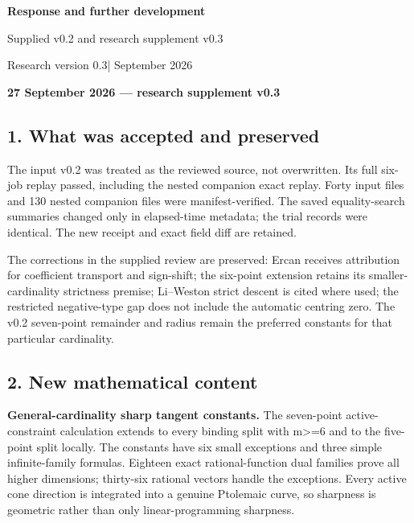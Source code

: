 \documentclass[11pt,a4paper]{article}
\begin{document}
\begin{center}
{\LARGE\bfseries Response and further development\par}
\vspace{6pt}
{\large Supplied v0.2 and research supplement v0.3\par}
\vspace{8pt}
{\small Research version 0.3\quad | September 2026\par}
\end{center}
\vspace{4pt}
\textbf{27 September 2026 --- research supplement v0.3}

\subsection{1. What was accepted and
preserved}\label{what-was-accepted-and-preserved}

The input v0.2 was treated as the reviewed source, not overwritten. Its
full six-job replay passed, including the nested companion exact replay.
Forty input files and 130 nested companion files were manifest-verified.
The saved equality-search summaries changed only in elapsed-time
metadata; the trial records were identical. The new receipt and exact
field diff are retained.

The corrections in the supplied review are preserved: Ercan receives
attribution for coefficient transport and sign-shift; the six-point
extension retains its smaller-cardinality strictness premise; Li--Weston
strict descent is cited where used; the restricted negative-type gap
does not include the automatic centring zero. The v0.2 seven-point
remainder and radius remain the preferred constants for that particular
cardinality.

\subsection{2. New mathematical content}\label{new-mathematical-content}

\textbf{General-cardinality sharp tangent constants.} The seven-point
active-constraint calculation extends to every binding split with
m\textgreater=6 and to the five-point split locally. The constants have
six small exceptions and three simple infinite-family formulas. Eighteen
exact rational-function dual families prove all higher dimensions;
thirty-six rational vectors handle the exceptions. Every active cone
direction is integrated into a genuine Ptolemaic curve, so sharpness is
geometric rather than only linear-programming sharpness.
\end{document}
